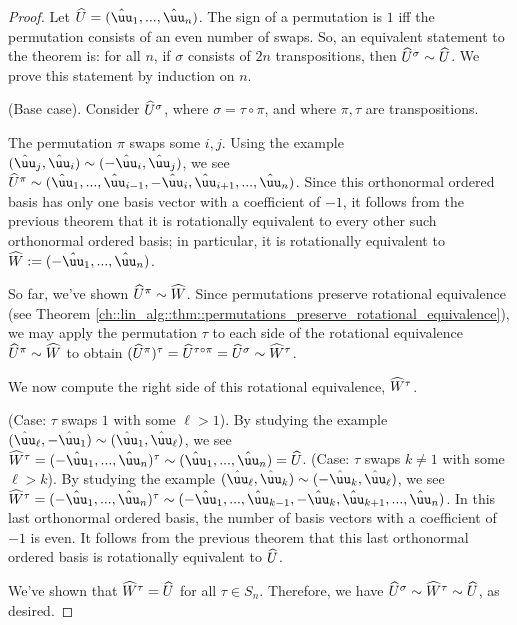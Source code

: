 \begin{proof}
    Let $\hU = (\huu_1, ..., \huu_n)$. The sign of a permutation is $1$ iff the permutation consists of an even number of swaps. So, an equivalent statement to the theorem is: for all $n$, if $\sigma$ consists of $2n$ transpositions, then $\widehat{U}^\sigma \sim \widehat{U}$. We prove this statement by induction on $n$.
    
    (Base case). Consider $\widehat{U}^\sigma$, where $\sigma = \tau \circ \pi$, and where $\pi, \tau$ are transpositions. 
    
    The permutation $\pi$ swaps some $i, j$. Using the example $(\huu_j, \huu_i) \sim (-\huu_i, \huu_j)$, we see \\ $\hU^\pi \sim (\huu_1, ..., \huu_{i - 1}, -\huu_i, \huu_{i + 1}, ..., \huu_n)$. Since this orthonormal ordered basis has only one basis vector with a coefficient of $-1$, it follows from the previous theorem that it is rotationally equivalent to every other such orthonormal ordered basis; in particular, it is rotationally equivalent to $\hW :=  (-\huu_1, ..., \huu_n)$.

    So far, we've shown $\widehat{U}^\pi \sim \widehat{W}$. Since permutations preserve rotational equivalence (see Theorem \ref{ch::lin_alg::thm::permutations_preserve_rotational_equivalence}), we may apply the permutation $\tau$ to each side of the rotational equivalence $\widehat{U}^\pi \sim \widehat{W}$ to obtain $(\widehat{U}^\pi)^\tau = \widehat{U}^{\tau \circ \pi}  = \widehat{U}^\sigma \sim \widehat{W}^\tau$.

    We now compute the right side of this rotational equivalence, $\widehat{W}^\tau$.

    \fullindent
    {
        (Case: $\tau$ swaps $1$ with some $\ell > 1$). By studying the example $(\huu_\ell, -\huu_1) \sim (\huu_1, \huu_\ell)$, we see $\hW^\tau = (-\huu_1, ..., \huu_n)^\tau \sim (\huu_1, ..., \huu_n) = \hU$.
    }
    \fullindent
    {
        (Case: $\tau$ swaps $k \neq 1$ with some $\ell > k$). By studying the example $(\huu_\ell, \huu_k) \sim (-\huu_k, \huu_\ell)$, we see $\hW^\tau = (-\huu_1, ..., \huu_n)^\tau \sim (-\huu_1, ..., \huu_{k - 1}, -\huu_k, \huu_{k + 1}, ..., \huu_n)$. In this last orthonormal ordered basis, the number of basis vectors with a coefficient of $-1$ is even. It follows from the previous theorem that this last orthonormal ordered basis is rotationally equivalent to $\widehat{U}$.
    }

    We've shown that $\widehat{W}^\tau = \widehat{U}$ for all $\tau \in S_n$. Therefore, we have $\widehat{U}^\sigma \sim \widehat{W}^\tau \sim \widehat{U}$, as desired.
    

\end{proof}
